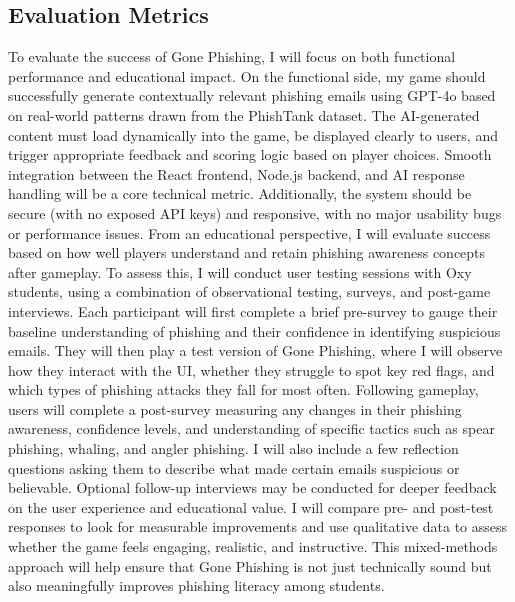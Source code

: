 \documentclass[10pt,twocolumn]{article}
\begin{document}
\subsection{Evaluation Metrics}
To evaluate the success of Gone Phishing, I will focus on both functional performance and educational impact. On the functional side, my game should successfully generate contextually relevant phishing emails using GPT-4o based on real-world patterns drawn from the PhishTank dataset. The AI-generated content must load dynamically into the game, be displayed clearly to users, and trigger appropriate feedback and scoring logic based on player choices. Smooth integration between the React frontend, Node.js backend, and AI response handling will be a core technical metric. Additionally, the system should be secure (with no exposed API keys) and responsive, with no major usability bugs or performance issues.
From an educational perspective, I will evaluate success based on how well players understand and retain phishing awareness concepts after gameplay. To assess this, I will conduct user testing sessions with Oxy students, using a combination of observational testing, surveys, and post-game interviews. Each participant will first complete a brief pre-survey to gauge their baseline understanding of phishing and their confidence in identifying suspicious emails. They will then play a test version of Gone Phishing, where I will observe how they interact with the UI, whether they struggle to spot key red flags, and which types of phishing attacks they fall for most often.
Following gameplay, users will complete a post-survey measuring any changes in their phishing awareness, confidence levels, and understanding of specific tactics such as spear phishing, whaling, and angler phishing. I will also include a few reflection questions asking them to describe what made certain emails suspicious or believable. Optional follow-up interviews may be conducted for deeper feedback on the user experience and educational value. I will compare pre- and post-test responses to look for measurable improvements and use qualitative data to assess whether the game feels engaging, realistic, and instructive. This mixed-methods approach will help ensure that Gone Phishing is not just technically sound but also meaningfully improves phishing literacy among students.
\end{document}
